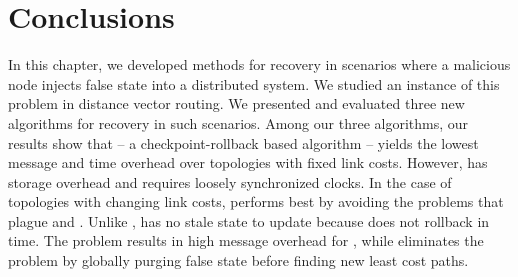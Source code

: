 \section{Conclusions}
\label{sec:rollback-conclude}

In this chapter, we developed methods for recovery in scenarios where a malicious node injects false state into a distributed system.  
We studied an instance of this problem in distance vector routing.
We presented and evaluated three new algorithms for recovery in such scenarios. %
Among our three algorithms, our results show that \cpr -- a checkpoint-rollback based algorithm -- yields the lowest message and time overhead over topologies
with fixed link costs.  However, \cpr has storage overhead and requires loosely synchronized clocks.
In the case of topologies with changing link costs, \purge performs best by avoiding the problems that plague \cpr and \seconds.
Unlike \cprs, \purge has no stale state to update because \purge does not rollback in time.  
The \infinity problem results in high message overhead for \seconds, while \purge eliminates the \infinity problem by globally purging false state before finding new least cost paths.



